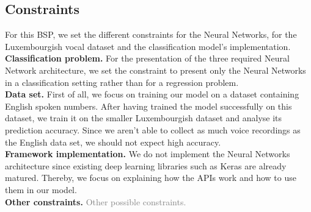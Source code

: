\subsection{Constraints}

For this BSP, we set the different constraints for the Neural Networks, for the
Luxembourgish vocal dataset and the classification model's implementation.\\

\textbf{Classification problem.} For the presentation of the three required
Neural Network architecture, we set the constraint to present only the Neural
Networks in a classification setting rather than for a regression problem. \\

\textbf{Data set.} First of all, we focus on training our model on a dataset
containing English spoken numbers. After having trained the model successfully
on this dataset, we train it on the smaller Luxembourgish dataset and analyse
its prediction accuracy. Since we aren't able to collect as much voice
recordings as the English data set, we should not expect high accuracy.\\

\textbf{Framework implementation.} We do not implement the Neural Networks
architecture since existing deep learning libraries such as Keras are already
matured. Thereby, we focus on explaining how the APIs work and how to use them
in our model.\\

\textbf{Other constraints.} \textcolor{gray}{Other possible constraints.}
